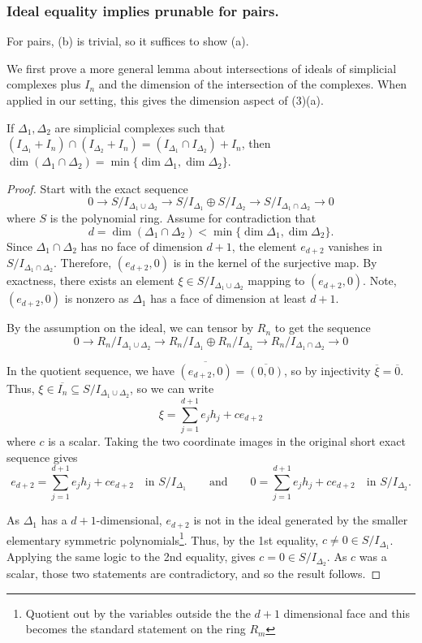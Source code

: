 \subsubsection{Ideal equality implies prunable for pairs.}
For pairs, (b) is trivial, so it suffices to show (a).

We first prove a more general lemma about intersections of ideals of simplicial complexes plus $I_n$ and the dimension of the intersection of the complexes.
When applied in our setting, this gives the dimension aspect of (3)(a). 
\begin{lemma}
\label{lem:dimension-complete}
If \(\Delta_{1},\Delta_{2}\) are simplicial complexes such that $(I_{\Delta_{1}}+I_n)\cap(I_{\Delta_{2}}+I_n)  =(I_{\Delta_{1}}\cap I_{\Delta_{2}}) +I_n$, then $ \dim(\Delta_{1}\cap\Delta_{2})  =\min\{\dim\Delta_{1},\dim\Delta_{2}\}$.
\end{lemma}


\begin{proof}
  Start with the exact sequence
    \[
    0\longrightarrow S/I_{\Delta_{1}\cup\Delta_{2}} \longrightarrow S/I_{\Delta_{1}}\oplus S/I_{\Delta_{2}} \longrightarrow S/I_{\Delta_{1}\cap\Delta_{2}} \longrightarrow0 
    \]
where $S$ is the polynomial ring.
Assume for contradiction that 
\[
d=\dim(\Delta_{1}\cap\Delta_{2}) <\min\{\dim\Delta_{1},\dim\Delta_{2}\}.
\]
Since \(\Delta_{1}\cap\Delta_{2}\) has no face of dimension \(d+1\), the element \(e_{d+2}\) vanishes in \(S/I_{\Delta_{1}\cap\Delta_{2}}\). 
Therefore, \((e_{d+2},0)\) is in the kernel of the surjective map.
By exactness, there exists an element \(\xi\in S/I_{\Delta_{1}\cup\Delta_{2}}\) mapping to \((e_{d+2},0)\).
Note, \((e_{d+2},0)\) is nonzero as $\Delta_{1}$ has a face of dimension at least $d+1$.

By the assumption on the ideal, we can tensor by $R_n$ to get the sequence
\[0\longrightarrow R_n/I_{\Delta_{1}\cup\Delta_{2}} \longrightarrow R_n/I_{\Delta_{1}}\oplus R_n/I_{\Delta_{2}} \longrightarrow R_n/I_{\Delta_{1}\cap\Delta_{2}} \longrightarrow0 \]

In the quotient sequence, we have \(\overline{(e_{d+2},0)} = \overline{(0,0)}\), so by injectivity \(\overline{\xi} =\overline{0}\).
Thus, \(\xi\in \overline{I_n}\subseteq S/I_{\Delta_{1}\cup\Delta_{2}}\), so we can write
\[ \xi=\sum_{j=1}^{d+1}e_jh_j+c e_{d+2} \]
where $c$ is a scalar.
Taking the two coordinate images in the original short exact sequence gives
\[ e_{d+2}=\sum_{j=1}^{d+1}e_jh_j+c e_{d+2} \quad\text{in }S/I_{\Delta_{1}}\qquad\text{and}\qquad 0=\sum_{j=1}^{d+1}e_jh_j+c e_{d+2} \quad\text{in }S/I_{\Delta_{2}}. \]


As $\Delta_{1}$ has a $d+1$-dimensional, $e_{d+2}$ is not in the ideal generated by the smaller elementary symmetric polynomials\footnote{Quotient out by the variables outside the the $d+1$ dimensional face and this becomes the standard statement on the ring $R_m$}.
Thus, by the 1st equality, \(c\neq 0\in S/I_{\Delta_1}\).
Applying the same logic to the 2nd equality, gives \(c=0\in S/I_{\Delta_2}\).
As $c$ was a scalar, those two statements are contradictory, and so the result follows.
\end{proof}

